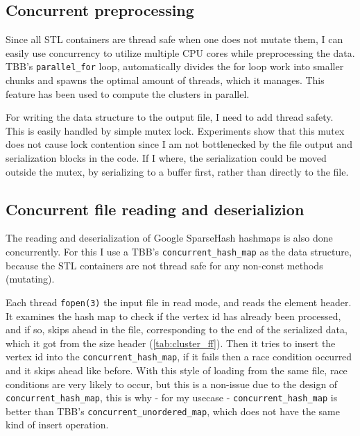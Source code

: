 \subsection{Concurrent preprocessing}\label{sec:multithread_compute}

Since all STL containers are thread safe when one does not mutate them, I can
easily use concurrency to utilize multiple CPU cores while preprocessing the
data. TBB's \texttt{parallel\_for} loop, automatically divides the for loop
work into smaller chunks and spawns the optimal amount of threads, which it
manages. This feature has been used to compute the clusters in parallel.

For writing the data structure to the output file, I need to add thread
safety. This is easily handled by simple mutex lock. Experiments show that
this mutex does not cause lock contention since I am not bottlenecked by
the file output and serialization blocks in the code. If I where, the
serialization could be moved outside the mutex, by serializing to a buffer
first, rather than directly to the file.

\subsection{Concurrent file reading and deserializion}\label{sec:file_read}

The reading and deserialization of Google SparseHash hashmaps is also done
concurrently. For this I use a TBB's \texttt{concurrent\_hash\_map} as the
data structure, because the STL containers are not thread safe for any
non-const methods (mutating).

Each thread \texttt{fopen(3)} the input file in read mode, and reads the
element header. It examines the hash map to check if the vertex id has
already been processed, and if so, skips ahead in the file, corresponding
to the end of the serialized data, which it got from the size header
(\autoref{tab:cluster_ff}). Then it tries to insert the vertex id into
the \texttt{concurrent\_hash\_map}, if it fails then a race condition
occurred and it skips ahead like before. With this style of loading from
the same file, race conditions are very likely to occur, but this is a
non-issue due to the design of \texttt{concurrent\_hash\_map}, this is why
- for my usecase - \texttt{concurrent\_hash\_map} is better than TBB's
\texttt{concurrent\_unordered\_map}, which does not have the same kind of
insert operation.
